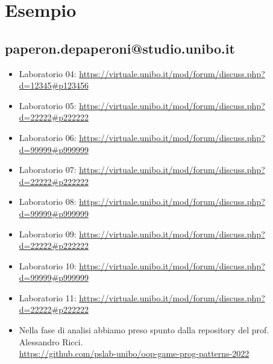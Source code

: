 \documentclass[a4paper,12pt]{report}
\begin{document}
\section*{Esempio}

\subsection{paperon.depaperoni@studio.unibo.it}

\begin{itemize}
    \item Laboratorio 04: \url{https://virtuale.unibo.it/mod/forum/discuss.php?d=12345#p123456}
    \item Laboratorio 05: \url{https://virtuale.unibo.it/mod/forum/discuss.php?d=22222#p222222}
    \item Laboratorio 06: \url{https://virtuale.unibo.it/mod/forum/discuss.php?d=99999#p999999}
    \item Laboratorio 07: \url{https://virtuale.unibo.it/mod/forum/discuss.php?d=22222#p222222}
    \item Laboratorio 08: \url{https://virtuale.unibo.it/mod/forum/discuss.php?d=99999#p999999}
    \item Laboratorio 09: \url{https://virtuale.unibo.it/mod/forum/discuss.php?d=22222#p222222}
    \item Laboratorio 10: \url{https://virtuale.unibo.it/mod/forum/discuss.php?d=99999#p999999}
    \item Laboratorio 11: \url{https://virtuale.unibo.it/mod/forum/discuss.php?d=22222#p222222}
\end{itemize}




\begin{itemize}
    \item Nella fase di analisi abbiamo preso spunto dalla repository del prof. Alessandro Ricci.
    \\\url{https://github.com/pslab-unibo/oop-game-prog-patterns-2022}
\end{itemize}
\end{document}
